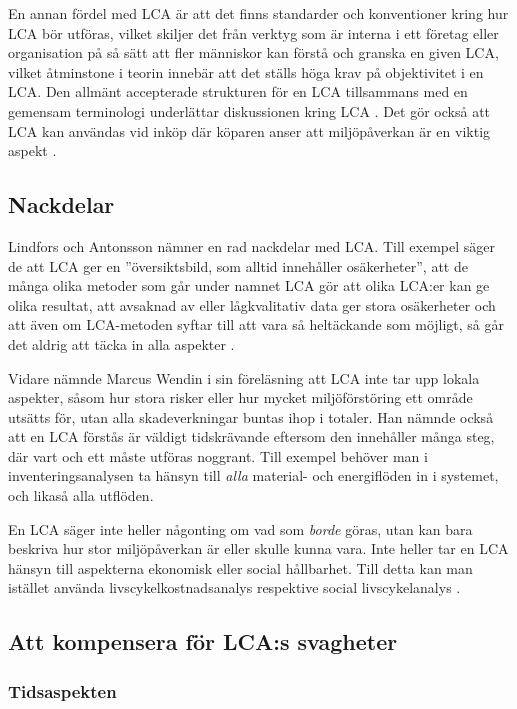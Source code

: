 \documentclass{article}
\begin{document}
En annan fördel med LCA är att det finns standarder och konventioner kring hur LCA bör utföras, vilket skiljer det från verktyg som är interna i ett företag eller organisation på så sätt att fler människor kan förstå och granska en given LCA, vilket åtminstone i teorin innebär att det ställs höga krav på objektivitet i en LCA. Den allmänt accepterade strukturen för en LCA tillsammans med en gemensam terminologi underlättar diskussionen kring LCA . Det gör också att LCA kan användas vid inköp där köparen anser att miljöpåverkan är en viktig aspekt .

\subsection{Nackdelar}

Lindfors och Antonsson nämner en rad nackdelar med LCA. Till exempel säger de att LCA ger en ''översikts\-bild, som alltid innehåller osäkerheter'', att de många olika metoder som går under namnet LCA gör att olika LCA:er kan ge olika resultat, att avsaknad av eller lågkvalitativ data ger stora osäkerheter och att även om LCA-metoden syftar till att vara så heltäckande som möjligt, så går det aldrig att täcka in alla aspekter .

Vidare nämnde Marcus Wendin i sin föreläsning att LCA inte tar upp lokala aspekter, såsom hur stora risker eller hur mycket miljöförstöring ett område utsätts för, utan alla skadeverkningar buntas ihop i totaler. Han nämnde också att en LCA förstås är väldigt tidskrävande eftersom den innehåller många steg, där vart och ett måste utföras noggrant. Till exempel behöver man i inventeringsanalysen ta hänsyn till \emph{alla} material- och energiflöden in i systemet, och likaså alla utflöden.

En LCA säger inte heller någonting om vad som \emph{borde} göras, utan kan bara beskriva hur stor miljö\-påverkan är eller skulle kunna vara. Inte heller tar en LCA hänsyn till aspekterna ekonomisk eller social hållbarhet. Till detta kan man istället använda livscykelkostnadsanalys respektive social livscykelanalys . 

\subsection{Att kompensera för LCA:s svagheter}

\subsubsection{Tidsaspekten}
\end{document}
